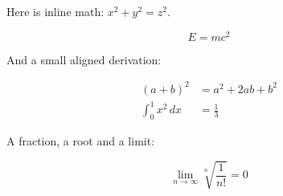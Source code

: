 
Here is inline math: $x^2 + y^2 = z^2$.

\begin{equation}
    E = mc^2
\end{equation}

And a small aligned derivation:

\begin{align}
    (a + b)^2 &= a^2 + 2ab + b^2 \\
    \int_0^1 x^2\,dx &= \frac{1}{3}
\end{align}

A fraction, a root and a limit:

\[
    \lim_{n \to \infty} \sqrt[n]{\frac{1}{n!}} = 0
\]

